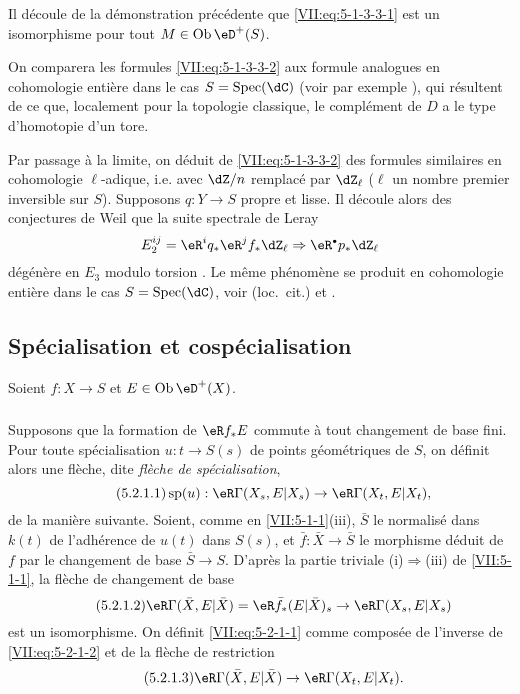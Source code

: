 Il découle de la démonstration précédente que \eqref{VII:eq:5-1-3-3-1} 
est un isomorphisme pour tout $M\in\ob\eD^+(S)$. 

On comparera les formules \eqref{VII:eq:5-1-3-3-2} aux formule analogues en 
cohomologie entière dans le cas $S=\spec(\dC)$ (voir par exemple 
\cite[3.1]{de71-2}), qui résultent de ce que, localement pour la topologie 
classique, le complément de $D$ a le type d'homotopie d'un tore. 

Par passage à la limite, on déduit de \eqref{VII:eq:5-1-3-3-2} des formules 
similaires en cohomologie $\ell$-adique, i.e. avec $\dZ/n$ remplacé par 
$\dZ_\ell$ ($\ell$ un nombre premier inversible sur $S$). Supposons 
$q:Y\to S$ propre et lisse. Il découle alors des conjectures de Weil 
\cite{de74,de80} que la suite spectrale de Leray 
\[
  E_2^{i j} = \eR^i q_\ast \eR^j f_\ast \dZ_\ell \Rightarrow \eR^\bullet p_\ast \dZ_\ell 
\]
dégénère en $E_3$ modulo torsion \cite[\S 6]{de71-1}. Le même 
phénomène se produit en cohomologie entière dans le cas 
$S=\spec(\dC)$, voir (loc.\ cit.) et \cite[3.2.13]{de71-2}. 





\subsection{Spécialisation et cospécialisation}\label{VII:5-2}

Soient $f:X\to S$ et $E\in\ob\eD^+(X)$. 





\subsubsection{}\label{VII:5-2-1}

Supposons que la formation de $\eR f_\ast E$ commute à tout changement de 
base fini. Pour toute spécialisation $u:t\to S(s)$ de points géométriques 
de $S$, on définit alors une flèche, dite \emph{flèche de 
spécialisation}, 
\begin{equation*}\tag{5.2.1.1}\label{VII:eq:5-2-1-1}
  \spe(u):\eR\Gamma(X_s,E|X_s) \to \eR\Gamma(X_t,E|X_t) \text{,}
\end{equation*}
de la manière suivante. Soient, comme en \ref{VII:5-1-1}(iii), $\bar S$ le 
normalisé dans $k(t)$ de l'adhérence de $u(t)$ dans $S(s)$, et 
$\bar f:\bar X\to \bar S$ le morphisme déduit de $f$ par le changement de 
base $\bar S\to S$. D'après la partie triviale (i)$\Rightarrow$(iii) de 
\ref{VII:5-1-1}, la flèche de changement de base
\begin{equation*}\tag{5.2.1.2}\label{VII:eq:5-2-1-2}
  \eR\Gamma(\bar X,E|\bar X)=\eR\bar f_\ast (E|\bar X)_s \to \eR\Gamma(X_s,E|X_s) 
\end{equation*}
est un isomorphisme. On définit \eqref{VII:eq:5-2-1-1} comme composée de 
l'inverse de \eqref{VII:eq:5-2-1-2} et de la flèche de restriction 
\begin{equation*}\tag{5.2.1.3}\label{VII:eq:5-2-1-3}
  \eR\Gamma(\bar X,E|\bar X) \to \eR\Gamma(X_t,E|X_t) \text{.}
\end{equation*}





